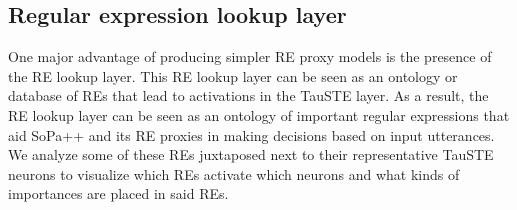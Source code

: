 \subsection{Regular expression lookup layer}

One major advantage of producing simpler RE proxy models is the presence of the
RE lookup layer. This RE lookup layer can be seen as an ontology or database of
REs that lead to activations in the TauSTE layer. As a result, the RE lookup
layer can be seen as an ontology of important regular expressions that aid
SoPa++ and its RE proxies in making decisions based on input utterances. We
analyze some of these REs juxtaposed next to their representative TauSTE neurons
to visualize which REs activate which neurons and what kinds of importances are
placed in said REs.

